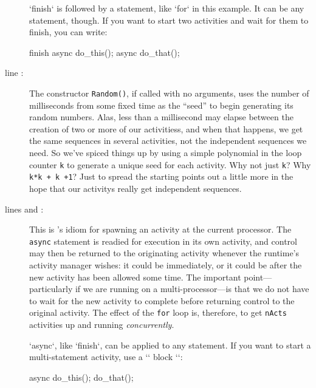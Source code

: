 \begin{description}
\xcd`finish` is followed by a statement, like \xcd`for` in this example.  It
can be any statement, though.  If you want to start two activities and wait
for them to finish, you can write: 

\begin{xtennum}[numbers=none]
finish {
  async do_this();
  async do_that();
}
\end{xtennum}


\item[line \xlref{mpia-r}{8}:]  The constructor {\tt Random()}, if called with no arguments,
uses the number of milliseconds from some fixed time as the ``seed'' to begin
generating its random numbers. Alas, less than a millisecond may elapse between
the creation of two or more of our activitiess, and when that happens, we get the
same sequences in several activities, not the independent sequences we need.
So we've spiced things up by using a simple
polynomial in the loop counter {\tt k} to generate a unique seed for each activity.
Why not just {\tt k}? Why {\tt k*k + k +1}?  Just to spread the starting points out
a little more in the hope that our activitys really
get independent sequences.

\item[lines \xlref{mpia-kval}{10} and \xlref{mpia-async}{11}:]
This is \Xten's idiom for spawning an activity
at the current processor.
The {\tt async} statement is readied for execution in its own activity, and control
may then be returned to the originating activity whenever the \Xten{} runtime's
activity manager wishes: it could be immediately, or it could be after the new
activity has been allowed some time. The important point---particularly if we
are running on a multi-processor---is that we do not have
to wait for the new activity to complete before returning control to the
original activity.  The effect of the {\tt for} loop is, therefore, to get
{\tt nActs} activities up and running {\em concurrently}.

\xcd`async`, like \xcd`finish`, can be applied to any statement.  If you want
to start a multi-statement activity, use a \xcd`{` block \xcd`}`: 

\begin{xtennum}[]
async {
  do_this();
  do_that();
}    
\end{xtennum}



\end{description}
